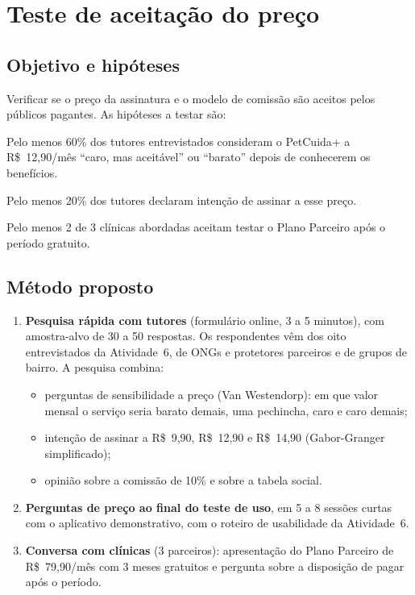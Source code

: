 \section{Teste de aceitação do preço}
\label{sec:teste}

\subsection{Objetivo e hipóteses}

Verificar se o preço da assinatura e o modelo de comissão são aceitos pelos públicos
pagantes. As hipóteses a testar são:

\begin{description}[font=\bfseries, leftmargin=1.4em, style=unboxed]
  \item[H1.] Pelo menos 60\% dos tutores entrevistados consideram o PetCuida+ a R\$~12,90/mês
  ``caro, mas aceitável'' ou ``barato'' depois de conhecerem os benefícios.
  \item[H2.] Pelo menos 20\% dos tutores declaram intenção de assinar a esse preço.
  \item[H3.] Pelo menos 2 de 3 clínicas abordadas aceitam testar o Plano Parceiro após o período gratuito.
\end{description}

\subsection{Método proposto}

\begin{enumerate}
  \item \textbf{Pesquisa rápida com tutores} (formulário online, 3 a 5 minutos), com amostra-alvo
  de 30 a 50 respostas. Os respondentes vêm dos oito entrevistados da Atividade~6, de ONGs
  e protetores parceiros e de grupos de bairro. A pesquisa combina:
  \begin{itemize}
    \item perguntas de sensibilidade a preço (Van Westendorp): em que valor mensal o serviço seria
    barato demais, uma pechincha, caro e caro demais;
    \item intenção de assinar a R\$~9,90, R\$~12,90 e R\$~14,90 (Gabor-Granger simplificado);
    \item opinião sobre a comissão de 10\% e sobre a tabela social.
  \end{itemize}
  \item \textbf{Perguntas de preço ao final do teste de uso}, em 5 a 8 sessões curtas com o
  aplicativo demonstrativo, com o roteiro de usabilidade da Atividade~6.
  \item \textbf{Conversa com clínicas} (3 parceiros): apresentação do Plano Parceiro de R\$~79,90/mês
  com 3 meses gratuitos e pergunta sobre a disposição de pagar após o período.
\end{enumerate}

